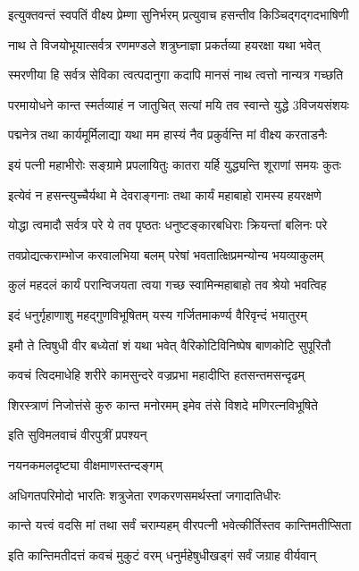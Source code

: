 \twolineshloka
{इत्युक्तवन्तं स्वपतिं वीक्ष्य प्रेम्णा सुनिर्भरम्}
{प्रत्युवाच हसन्तीव किञ्चिद्गद्गदभाषिणी}%

\twolineshloka
{नाथ ते विजयोभूयात्सर्वत्र रणमण्डले}
{शत्रुघ्नाज्ञा प्रकर्तव्या हयरक्षा यथा भवेत्}%

\twolineshloka
{स्मरणीया हि सर्वत्र सेविका त्वत्पदानुगा}
{कदापि मानसं नाथ त्वत्तो नान्यत्र गच्छति}%

\twolineshloka
{परमायोधने कान्त स्मर्तव्याहं न जातुचित्}
{सत्यां मयि तव स्वान्ते युद्धे 3विजयसंशयः}%

\twolineshloka
{पद्मनेत्र तथा कार्यमूर्मिलाद्या यथा मम}
{हास्यं नैव प्रकुर्वन्ति मां वीक्ष्य करताडनैः}%

\twolineshloka
{इयं पत्नी महाभीरोः सङ्ग्रामे प्रपलायितुः}
{कातरा यर्हि युद्ध्यन्ति शूराणां समयः कुतः}%

\twolineshloka
{इत्येवं न हसन्त्युच्चैर्यथा मे देवराङ्गनाः}
{तथा कार्यं महाबाहो रामस्य हयरक्षणे}%

\twolineshloka
{योद्धा त्वमादौ सर्वत्र परे ये तव पृष्ठतः}
{धनुष्टङ्कारबधिराः क्रियन्तां बलिनः परे}%

\twolineshloka
{तवप्रोद्यत्कराम्भोज करवालभिया बलम्}
{परेषां भवतात्क्षिप्रमन्योन्य भयव्याकुलम्}%

\twolineshloka
{कुलं महदलं कार्यं परान्विजयता त्वया}
{गच्छ स्वामिन्महाबाहो तव श्रेयो भवत्विह}%

\twolineshloka
{इदं धनुर्गृहाणाशु महद्गुणविभूषितम्}
{यस्य गर्जितमाकर्ण्य वैरिवृन्दं भयातुरम्}%

\twolineshloka
{इमौ ते त्विषुधी वीर बध्येतां शं यथा भवेत्}
{वैरिकोटिविनिष्पेष बाणकोटि सुपूरितौ}%

\twolineshloka
{कवचं त्विदमाधेहि शरीरे कामसुन्दरे}
{वज्रप्रभा महादीप्ति हतसन्तमसन्दृढम्}%

\twolineshloka
{शिरस्त्राणं निजोत्तंसे कुरु कान्त मनोरमम्}
{इमेव तंसे विशदे मणिरत्नविभूषिते}%

इति सुविमलवाचं वीरपुत्रीं प्रपश्यन्

नयनकमलदृष्ट्या वीक्षमाणस्तन्दङ्गम्

\twolineshloka
{अधिगतपरिमोदो भारतिः शत्रुजेता}
{रणकरणसमर्थस्तां जगादातिधीरः}%


\twolineshloka
{कान्ते यत्त्वं वदसि मां तथा सर्वं चराम्यहम्}
{वीरपत्नी भवेत्कीर्तिस्तव कान्तिमतीप्सिता}%

\twolineshloka
{इति कान्तिमतीदत्तं कवचं मुकुटं वरम्}
{धनुर्महेषुधीखड्गं सर्वं जग्राह वीर्यवान्}%

